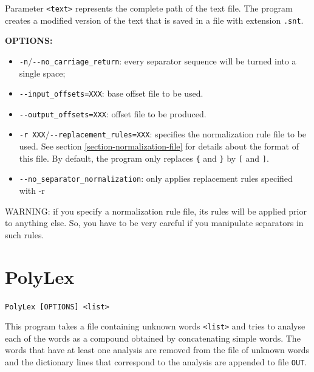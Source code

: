 \bigskip
\noindent {}Parameter \verb+<text>+ 
represents the complete path of the text file. The program
creates a modified version of the text that is saved in a file with extension
\verb+.snt+.

\bigskip
\noindent \textbf{OPTIONS:}
\begin{itemize}
  \item \verb+-n+/\verb+--no_carriage_return+: every separator sequence will be turned into a single space;
  \item \verb+--input_offsets=XXX+: base offset file to be used.
  \item \verb+--output_offsets=XXX+: offset file to be produced.
  \item \verb+-r XXX+/\verb+--replacement_rules=XXX+: specifies the
  normalization rule file to be used. See section \ref{section-normalization-file} 
  for details about the format of
  this file. By default, the program only replaces \verb+{+ and \verb+}+ by
  \verb+[+ and \verb+]+.
  \item \verb+--no_separator_normalization+: only applies replacement rules specified with -r
\end{itemize}

\bigskip
\noindent WARNING: if you specify a normalization rule file, its rules will be
applied prior to anything else. So, you have to be very careful if you
manipulate separators in such rules.






\section{PolyLex}
\verb+PolyLex [OPTIONS] <list>+


\bigskip
\noindent This program takes a file containing unknown words \verb+<list>+ and
tries to analyse each of the words as a compound obtained by concatenating simple words. The words
that have at least one analysis are removed from the file of unknown words and
the dictionary lines that correspond to the analysis are appended to file
\verb+OUT+. 

